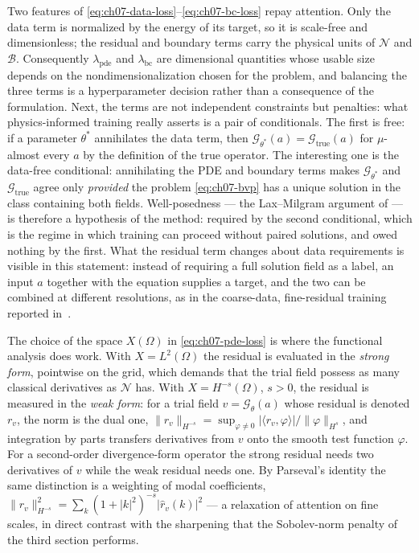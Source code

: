 Two features of \eqref{eq:ch07-data-loss}--\eqref{eq:ch07-bc-loss} repay attention. Only the
data term is normalized by the energy of its target, so it is scale-free and dimensionless;
the residual and boundary terms carry the physical units of $\mathcal{N}$ and
$\mathcal{B}$. Consequently $\lambda_{\text{pde}}$ and $\lambda_{\text{bc}}$ are dimensional
quantities whose usable size depends on the nondimensionalization chosen for the problem,
and balancing the three terms is a hyperparameter decision rather than a consequence of the
formulation. Next, the terms are not independent constraints but penalties: what
physics-informed training really asserts is a pair of conditionals. The first is
free: if a parameter $\theta^{*}$ annihilates the data term, then
$\mathcal{G}_{\theta^{*}}(a)=\mathcal{G}_{\text{true}}(a)$ for $\mu$-almost every
$a$ by the definition of the true operator. The interesting one is the data-free
conditional: annihilating the PDE and boundary terms makes
$\mathcal{G}_{\theta^{*}}$ and $\mathcal{G}_{\text{true}}$ agree only \emph{provided}
the problem \eqref{eq:ch07-bvp} has a unique solution in the class containing both
fields. Well-posedness --- the Lax--Milgram argument of
 --- is therefore a hypothesis of
the method: required by the second conditional, which is the regime in which training can
proceed without paired solutions, and owed nothing by the first. What the residual term changes about data
requirements is visible in this statement: instead of requiring a full solution field as a
label, an input $a$ together with the equation supplies a target, and the two can be
combined at different resolutions, as in the coarse-data, fine-residual training reported
in~\cite{li2021physics}.

The choice of the space $X(\Omega)$ in \eqref{eq:ch07-pde-loss} is where the functional
analysis does work. With $X=L^2(\Omega)$ the residual is evaluated in the \emph{strong form},
pointwise on the grid, which demands that the trial field possess as many classical
derivatives as $\mathcal{N}$ has. With $X=H^{-s}(\Omega)$, $s>0$, the residual is measured in
the \emph{weak form}: for a trial field $v=\mathcal{G}_\theta(a)$ whose residual is denoted
$r_v$, the norm is the dual one,
$\|r_v\|_{H^{-s}}=\sup_{\varphi\neq0}|\langle r_v,\varphi\rangle|/\|\varphi\|_{H^{s}}$, and
integration by parts transfers derivatives from $v$ onto the smooth test function
$\varphi$. For a second-order divergence-form operator the
strong residual needs two derivatives of $v$ while the weak residual needs one. By Parseval's
identity the same distinction is a weighting of modal coefficients,
$\|r_v\|_{H^{-s}}^{2}=\sum_{k}(1+|k|^{2})^{-s}|\hat{r}_v(k)|^{2}$ --- a relaxation of
attention on fine scales, in direct contrast with the sharpening that the Sobolev-norm
penalty of the third section performs.


